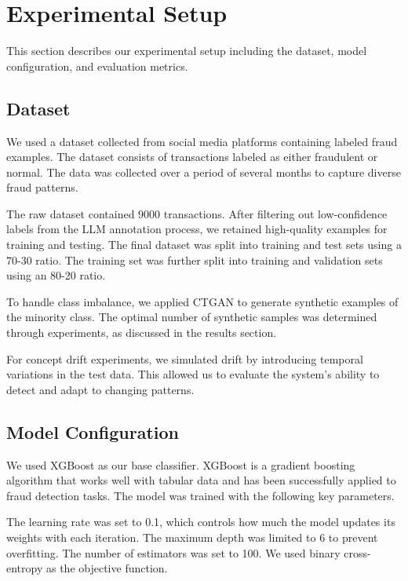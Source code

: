 \section{Experimental Setup}\label{sec:experimental}

This section describes our experimental setup including the dataset, model configuration, and evaluation metrics.

\subsection{Dataset}

We used a dataset collected from social media platforms containing labeled fraud examples. The dataset consists of transactions labeled as either fraudulent or normal. The data was collected over a period of several months to capture diverse fraud patterns.

The raw dataset contained 9000 transactions. After filtering out low-confidence labels from the LLM annotation process, we retained high-quality examples for training and testing. The final dataset was split into training and test sets using a 70-30 ratio. The training set was further split into training and validation sets using an 80-20 ratio.

To handle class imbalance, we applied CTGAN to generate synthetic examples of the minority class. The optimal number of synthetic samples was determined through experiments, as discussed in the results section.

For concept drift experiments, we simulated drift by introducing temporal variations in the test data. This allowed us to evaluate the system's ability to detect and adapt to changing patterns.

\subsection{Model Configuration}

We used XGBoost as our base classifier. XGBoost is a gradient boosting algorithm that works well with tabular data and has been successfully applied to fraud detection tasks. The model was trained with the following key parameters.

The learning rate was set to 0.1, which controls how much the model updates its weights with each iteration. The maximum depth was limited to 6 to prevent overfitting. The number of estimators was set to 100. We used binary cross-entropy as the objective function.

